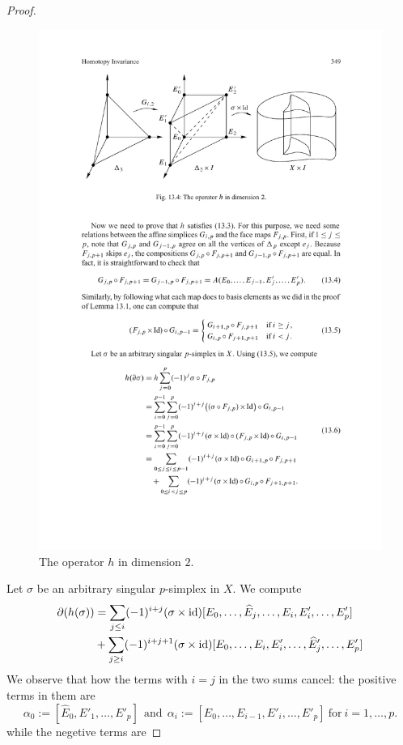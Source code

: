 \begin{proof}
\begin{figure}[htbp]
\includegraphics{chain-homotopy}
\caption{The operator $h$ in dimension $2$.}
\end{figure}
Let $\sigma$ be an arbitrary singular $p$-simplex in $X$. We compute
\begin{align*}
\partial(h(\sigma))&=\sum_{j\leq i}(-1)^{i+j}(\sigma\times\mathrm{id})[E_0,\dots,\widehat{E}_j,\dots,E_i,E'_i,\dots,E'_p]\\
&+\sum_{j\geq i}(-1)^{i+j+1}(\sigma\times\mathrm{id})[E_0,\dots,E_i,E'_i,\dots,\widehat{E}'_j,\dots,E'_p]
\end{align*}
We observe that how the terms with $i=j$ in the two sums cancel: the positive terms in them are
\[\alpha_0:=[\widehat{E}_0,E'_1,\dots,E'_p]\ \ \text{and}\ \  \alpha_i:=[E_0,\dots,E_{i-1},E'_{i},\dots,E'_p]\ \text{for}\ i=1,\dots,p.\]
while the negetive terms are

\end{proof}
